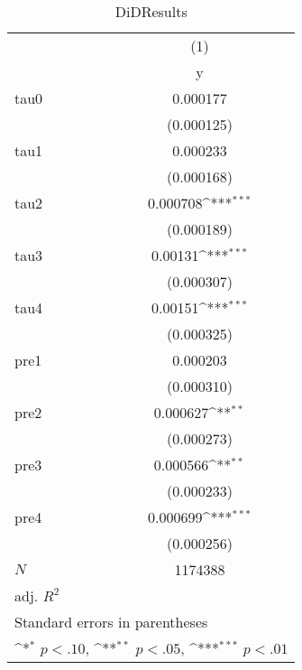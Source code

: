 \begin{table}[htbp]\centering
\def\sym#1{\ifmmode^{#1}\else\(^{#1}\)\fi}
\caption{DiDResults}
\begin{tabular}{l*{1}{c}}
\hline\hline
            &\multicolumn{1}{c}{(1)}\\
            &\multicolumn{1}{c}{y}\\
\hline
tau0        &    0.000177         \\
            &  (0.000125)         \\
[1em]
tau1        &    0.000233         \\
            &  (0.000168)         \\
[1em]
tau2        &    0.000708\sym{***}\\
            &  (0.000189)         \\
[1em]
tau3        &     0.00131\sym{***}\\
            &  (0.000307)         \\
[1em]
tau4        &     0.00151\sym{***}\\
            &  (0.000325)         \\
[1em]
pre1        &    0.000203         \\
            &  (0.000310)         \\
[1em]
pre2        &    0.000627\sym{**} \\
            &  (0.000273)         \\
[1em]
pre3        &    0.000566\sym{**} \\
            &  (0.000233)         \\
[1em]
pre4        &    0.000699\sym{***}\\
            &  (0.000256)         \\
\hline
\(N\)       &     1174388         \\
adj. \(R^{2}\)&                     \\
\hline\hline
\multicolumn{2}{l}{\footnotesize Standard errors in parentheses}\\
\multicolumn{2}{l}{\footnotesize \sym{*} \(p<.10\), \sym{**} \(p<.05\), \sym{***} \(p<.01\)}\\
\end{tabular}
\end{table}
